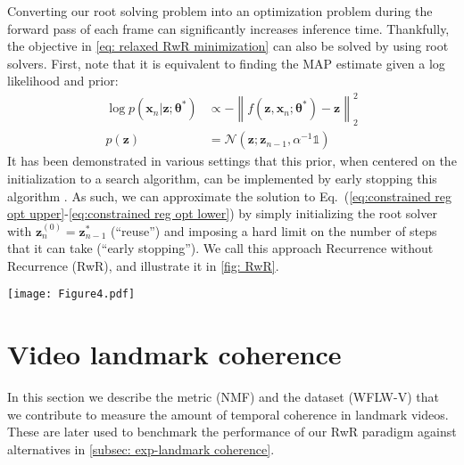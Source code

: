 \documentclass[10pt,twocolumn,letterpaper]{article}
\newcommand\norm[1]{\left\lVert#1\right\rVert}
\newcommand{\bo}[1]{\bm{#1}}
\def\vtheta{{\bm{\theta}}}
\def\vx{{\bm{x}}}
\def\vz{{\bm{z}}}
\begin{document}
Converting our root solving problem into an optimization problem during the forward pass of each frame can significantly increases inference time. Thankfully, the objective in \cref{eq: relaxed RwR minimization} can also be solved by using root solvers. First, note that it is equivalent to finding the MAP estimate given a log likelihood and prior: 
\begin{subequations}
\begin{align}
\log p(\vx_n | \vz; \vtheta^*) &\propto - \norm{f(\vz, \vx_n; \vtheta^*) - \vz}_2^2 \label{eq:likelihood} \\
p(\vz) &= \mathcal{N}(\vz; \vz_{n-1}, \alpha^{-1} \mathbb{1}) \label{eq:prior}
\end{align}
\end{subequations}
It has been demonstrated in various settings that this prior, when centered on the initialization to a search algorithm, can be implemented by early stopping this algorithm \cite{Sjoberg1992Overtraining, Bishop1995RegularizationComplexityControl, Santos1996EquivalenceRegAndTruncation, Grant2018RecastingMAMLasHierBayes}. As such, we can approximate the solution to Eq.~(\ref{eq:constrained reg opt upper}-\ref{eq:constrained reg opt lower}) by simply initializing the root solver with $\vz_n^{(0)} = \vz_{n-1}^*$ (``reuse'') and imposing a hard limit on the number of steps that it can take (``early stopping''). We call this approach Recurrence without Recurrence (RwR), and illustrate it in \cref{fig: RwR}.

\begin{figure*}[t!]
  \centering
   \texttt{[image: Figure4.pdf]}
   \caption{Recurrence without recurrence (RwR) on video data, from an LDEQ that was trained on still images. We use the initialization $\vz_1^{(0)} = \bo{0}$ for the first frame, and then reuse $\vz_n^{(0)} = \vz_{n-1}^*$ for $n > 1$. Combined with early stopping, this is equivalent to regularizing the fixed point $\vz_n$ so that it is more temporally coherent with all its predecessors.} \label{fig: RwR}
\end{figure*}

\section{Video landmark coherence}

In this section we describe the metric (NMF) and the dataset (WFLW-V) that we contribute to measure the amount of temporal coherence in landmark videos. These are later used to benchmark the performance of our RwR paradigm against alternatives in \cref{subsec: exp-landmark coherence}. 
\end{document}
